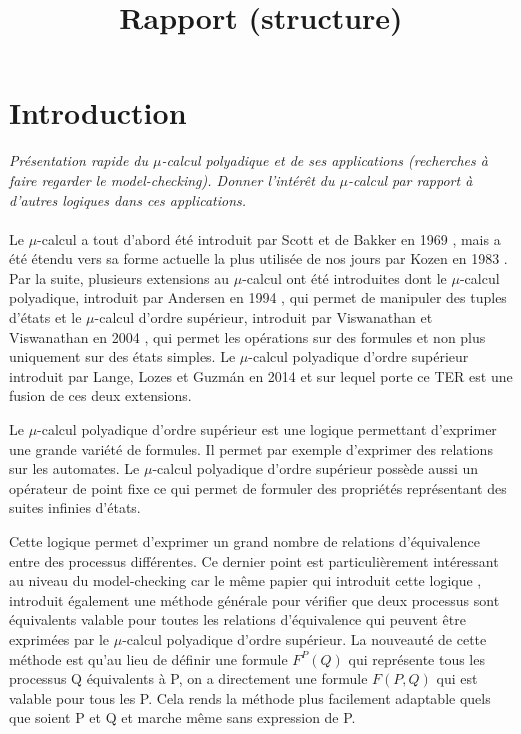 \documentclass[11pt,a4paper]{article}
\title{Rapport (structure)}
\date{}
\begin{document}
\maketitle

\theoremstyle{plain}
\newtheorem{thm}{Théorème}
\newtheorem{lem}{Lemme}
\newtheorem{crl}{Corollaire}
\newtheorem{prop}{Proposition}

\theoremstyle{remark}
\newtheorem{rema}{Remarque}

\theoremstyle{definition}
\newtheorem{notat}{Notation}
\newtheorem{dfn}{Définition}
\newtheorem{exem}{Exemple}

\theoremstyle{nonumberplain}
\newtheorem{idp}{Idée de preuve}
\newtheorem{prv}{Preuve}

\section*{Introduction}

\textit{Présentation rapide du $\mu$-calcul polyadique et de ses applications (recherches à faire regarder le model-checking). Donner l'intérêt du $\mu$-calcul par rapport à d'autres logiques dans ces applications.}
\\\\

Le $\mu$-calcul a tout d'abord été introduit par Scott et de Bakker en 1969 \cite{scott1969theory}, mais a été étendu vers sa forme actuelle la plus utilisée de nos jours par Kozen en 1983 \cite{kozen1983results}. Par la suite, plusieurs extensions au 
$\mu$-calcul ont été introduites dont le $\mu$-calcul polyadique, introduit par Andersen en 1994 \cite{andersen1994polyadic}, qui permet de manipuler des tuples d'états et le $\mu$-calcul d'ordre supérieur, introduit par Viswanathan et Viswanathan en 2004 \cite{viswanathan2004higher}, qui permet les opérations sur des formules et non plus uniquement sur des états simples. Le $\mu$-calcul polyadique d'ordre supérieur introduit par Lange, Lozes et Guzm{\'a}n en 2014 \cite{lange2014model} et sur lequel porte ce TER est une fusion de ces deux extensions.

Le $\mu$-calcul polyadique d'ordre supérieur est une logique permettant d'exprimer une grande variété de formules. Il permet par exemple d'exprimer des relations sur les automates. Le $\mu$-calcul polyadique d'ordre supérieur possède aussi un opérateur de point fixe ce qui permet de formuler des propriétés représentant des suites infinies d'états. 

Cette logique permet d'exprimer un grand nombre de relations d'équivalence entre des processus différentes. Ce dernier point est particulièrement intéressant au niveau du model-checking car le même papier qui introduit cette logique \cite{lange2014model}, introduit également une méthode générale pour vérifier que deux processus sont équivalents valable pour toutes les relations d'équivalence qui peuvent être exprimées par le $\mu$-calcul polyadique d'ordre supérieur. La nouveauté de cette méthode est qu'au lieu de définir une formule $F^P(Q)$ qui représente tous les processus Q équivalents à P, on a directement une formule $F(P, Q)$ qui est valable pour tous les P. Cela rends la méthode plus facilement adaptable quels que soient P et Q et marche même sans expression de P. 
\end{document}
